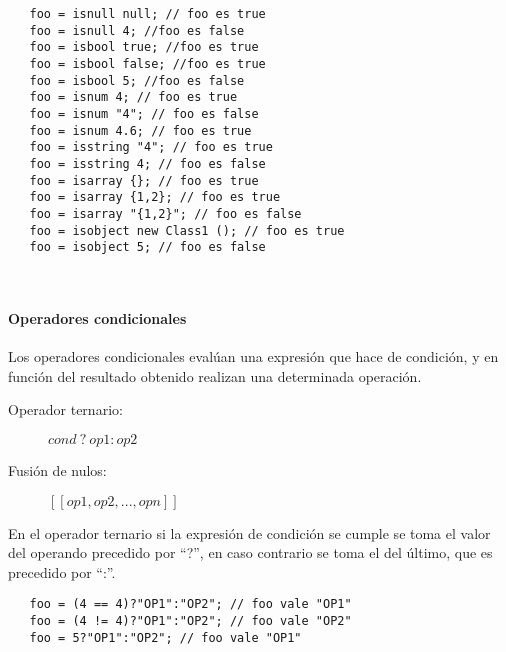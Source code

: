 \begin{lstlisting}
   foo = isnull null; // foo es true
   foo = isnull 4; //foo es false
   foo = isbool true; //foo es true
   foo = isbool false; //foo es true
   foo = isbool 5; //foo es false
   foo = isnum 4; // foo es true
   foo = isnum "4"; // foo es false
   foo = isnum 4.6; // foo es true
   foo = isstring "4"; // foo es true
   foo = isstring 4; // foo es false
   foo = isarray {}; // foo es true
   foo = isarray {1,2}; // foo es true 
   foo = isarray "{1,2}"; // foo es false
   foo = isobject new Class1 (); // foo es true
   foo = isobject 5; // foo es false 
\end{lstlisting} 
\hfill\\


\paragraph{Operadores condicionales} \label{sec:op_cond}

Los operadores condicionales evalúan una expresión que hace de condición, y en función del resultado obtenido realizan una determinada operación.

\begin{description}
\item [Operador ternario:] $cond\ ?\ op1:op2$
\item [Fusión de nulos:] $[[ op1, op2,...,opn ]]$
\end{description} 


En el operador ternario si la expresión de condición se cumple se toma el valor del operando precedido por ``?'', en caso contrario se toma el del último, que es precedido por ``:''. \\

\begin{lstlisting}
   foo = (4 == 4)?"OP1":"OP2"; // foo vale "OP1"
   foo = (4 != 4)?"OP1":"OP2"; // foo vale "OP2"
   foo = 5?"OP1":"OP2"; // foo vale "OP1"
\end{lstlisting} 
\hfill\\

